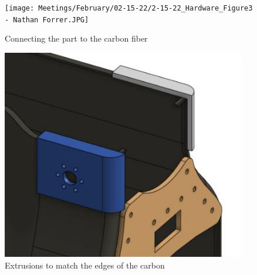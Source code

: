 \begin{figure}[ht]
\centering
\begin{minipage}[b]{.48\textwidth}
  \centering
  \texttt{[image: Meetings/February/02-15-22/2-15-22\_Hardware\_Figure3 - Nathan Forrer.JPG]}
  \caption{Connecting the part to the carbon fiber}
  \label{fig:021522_3}
\end{minipage}%
\hfill%
\begin{minipage}[b]{.48\textwidth}
  \centering
  \includegraphics[width=0.95\textwidth]{Meetings/February/02-15-22/2-15-22_Hardware_Figure4 - Nathan Forrer.JPG}
  \caption{Extrusions to match the edges of the carbon}
  \label{fig:021522_4}
\end{minipage}
\end{figure}





